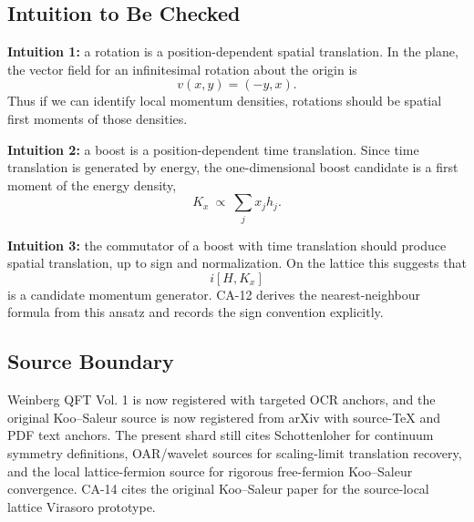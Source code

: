 \subsection{Intuition to Be Checked}

\textbf{Intuition 1:} a rotation is a position-dependent spatial translation.
In the plane, the vector field for an infinitesimal rotation about the origin is
\[
  v(x,y)=(-y,x).
\]
Thus if we can identify local momentum densities, rotations should be spatial
first moments of those densities.

\textbf{Intuition 2:} a boost is a position-dependent time translation.  Since
time translation is generated by energy, the one-dimensional boost candidate is
a first moment of the energy density,
\[
  K_x\ \propto\ \sum_j x_j h_j.
\]

\textbf{Intuition 3:} the commutator of a boost with time translation should
produce spatial translation, up to sign and normalization.  On the lattice this
suggests that
\[
  i[H,K_x]
\]
is a candidate momentum generator.  CA-12 derives the nearest-neighbour formula
from this ansatz and records the sign convention explicitly.

\subsection{Source Boundary}

Weinberg QFT Vol. 1 is now registered with targeted OCR anchors, and the
original Koo--Saleur source is now registered from arXiv with source-TeX and PDF
text anchors.  The present shard still cites Schottenloher for continuum
symmetry definitions, OAR/wavelet sources for scaling-limit translation
recovery, and the local lattice-fermion source for rigorous free-fermion
Koo--Saleur convergence.  CA-14 cites the original Koo--Saleur paper for the
source-local lattice Virasoro prototype.
